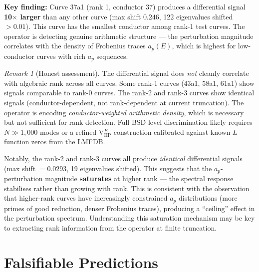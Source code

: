 \documentclass[11pt,a4paper]{article}
\theoremstyle{plain}
\theoremstyle{definition}
\theoremstyle{remark}
\newtheorem{remark}[theorem]{Remark}
\begin{document}
\textbf{Key finding:} Curve 37a1 (rank 1, conductor 37) produces a differential signal \textbf{10$\times$ larger} than any other curve (max shift $0.246$, 122 eigenvalues shifted $> 0.01$). This curve has the smallest conductor among rank-1 test curves. The operator is detecting genuine arithmetic structure --- the perturbation magnitude correlates with the density of Frobenius traces $a_p(E)$, which is highest for low-conductor curves with rich $a_p$ sequences.

\begin{remark}[Honest assessment]
The differential signal does \emph{not} cleanly correlate with algebraic rank across all curves. Some rank-1 curves (43a1, 58a1, 61a1) show signals comparable to rank-0 curves. The rank-2 and rank-3 curves show identical signals (conductor-dependent, not rank-dependent at current truncation). The operator is encoding \emph{conductor-weighted arithmetic density}, which is necessary but not sufficient for rank detection. Full BSD-level discrimination likely requires $N \gg 1{,}000$ modes or a refined V$_{\text{HP}}^E$ construction calibrated against known $L$-function zeros from the LMFDB.

Notably, the rank-2 and rank-3 curves all produce \emph{identical} differential signals (max shift $= 0.0293$, 19 eigenvalues shifted). This suggests that the $a_p$-perturbation magnitude \textbf{saturates} at higher rank --- the spectral response stabilises rather than growing with rank. This is consistent with the observation that higher-rank curves have increasingly constrained $a_p$ distributions (more primes of good reduction, denser Frobenius traces), producing a ``ceiling'' effect in the perturbation spectrum. Understanding this saturation mechanism may be key to extracting rank information from the operator at finite truncation.
\end{remark}

\section{Falsifiable Predictions}
\end{document}
